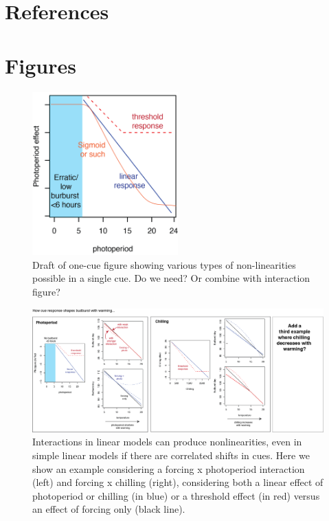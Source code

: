 \documentclass[11pt,letter]{article}
\begin{document}
\clearpage

\section{References}


\clearpage

\section{Figures}

\begin{figure}
\centering
\includegraphics[width=0.5\textwidth]{figures/limcues_nonlin_onecue.png}
\caption{Draft of one-cue figure showing various types of non-linearities possible in a single cue. Do we need? Or combine with interaction figure?}
  \label{fig:onecue}
\end{figure}


\begin{figure}
\centering
\includegraphics[width=1\textwidth]{figures/limcues_intxns.png}
\caption{Interactions in linear models can produce nonlinearities, even in simple linear models if there are correlated shifts in cues. Here we show an example considering a forcing x photoperiod interaction (left) and forcing x chilling (right), considering both a linear effect of photoperiod or chilling (in blue) or a threshold effect (in red) versus an effect of forcing only (black line).}
  \label{fig:intxncues}
\end{figure}
\end{document}
